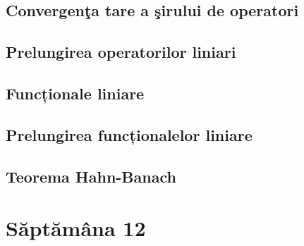 \documentclass[a4paper,12pt]{article}
\theoremstyle{change}
\begin{document}
\subsection{Convergenţa tare a şirului de operatori}

\subsection{Prelungirea operatorilor liniari}


\subsection{Funcționale liniare}


\subsection{Prelungirea funcționalelor liniare}

\subsection{Teorema Hahn-Banach}

\section{Săptămâna 12}

\end{document}
